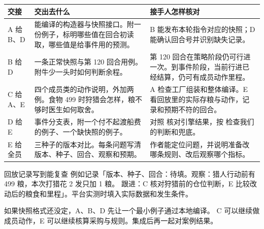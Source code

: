 \documentclass[UTF8,11pt,a4paper]{ctexart}
\begin{document}
\begin{center}\small
\begin{tabularx}{\linewidth}{@{}L{2.0cm}Y Y@{}}
\toprule
交接 & 交出去什么 & 接手人怎样核对 \\
\midrule
A 给 B、D &
能编译的构造器与快照接口。附一份例子，标明哪些值在回合初读取，哪些值是给事件用的预测。 &
B 能发布本轮指令对应的快照；D 能确认回合号并识别缺失记录。 \\
B 给 D &
一条正常快照与第 120 回合用例。附牛少一头时如何判断余程。 &
第 120 回合在策略阶段仍可行进一次。到事件阶段，当前行进已经结算，仍可有成员动作里程。 \\
C 给 A、E &
四个成员类的动作说明，外加两例。食物 499 时狩猎会怎样，粮不够时医生如何取舍。 &
A 检查工厂组装和整体编译。E 看回放里的实际存粮与动作，记录和预期不符的回合。 \\
D 给 E &
事件分支表，附一个付不起渡船费的例子、一个缺快照的例子。 &
对照 核对引擎结果，按
检查我们的判断和兜底。 \\
E 给全员 &
三种子的版本对比。每条问题写清版本、种子、回合、观察和预期。 &
作者能定位问题，并说明准备改哪条规则、改后观察哪个指标。 \\
\bottomrule
\end{tabularx}
\end{center}

\begin{keybox}{回放记录写到能复查}
例如记录「版本、种子、回合：待填。观察：猎人行动前有 499 粮，本次打猎花 2 发只加 1 粮。
跟进：C 核对狩猎前的仓位判断，E 比较改动后的粮食和里程」。平台实测时填入实际数据和发生条件。
\end{keybox}

\noindent 如果快照格式还没定，A、B、D 先让一个最小例子通过本地编译。
C 可以继续做成员动作，E 可以继续核算采购与规则。集成后再一起对案例结果。
\end{document}
